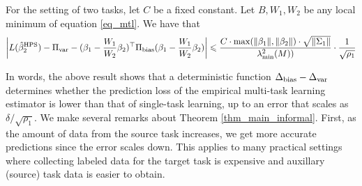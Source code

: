 \begin{theorem}\label{thm_main_informal}
	For the setting of two tasks, let $C$ be a fixed constant.
	Let $B, W_1, W_2$ be any local minimum of equation \eqref{eq_mtl}.
	We have that
	\begin{align*}
		{\left| {L(\hat{\beta}_2^{\textup{HPS}}) - \Pi_{\text{var}} - (\beta_1 - \frac{W_1}{W_2}\beta_2)^{\top}\Pi_{\text{bias}} (\beta_1 - \frac{W_1}{W_2}\beta_2)} \right|} \leqslant \frac{ C\cdot \max(\|\beta_1\|, \|\beta_2\|) \cdot \sqrt{\|\Sigma_1\|} } {\lambda_{\min}^2(M)) } \cdot \frac{1}{\sqrt{\rho_1}}
	\end{align*}
\end{theorem}
In words, the above result shows that a deterministic function $\Delta_{\text{bias}} - \Delta_{\text{var}}$ determines whether the prediction loss of the empirical multi-task learning estimator is lower than that of single-task learning, up to an error that scales as $\delta / \sqrt{\rho_1}$.
We make several remarks about Theorem \ref{thm_main_informal}.
First, as the amount of data from the source task increases, we get more accurate predictions  since the error scales down.
This applies to many practical settings where collecting labeled data for the target task is expensive and auxillary (source) task data is easier to obtain.
